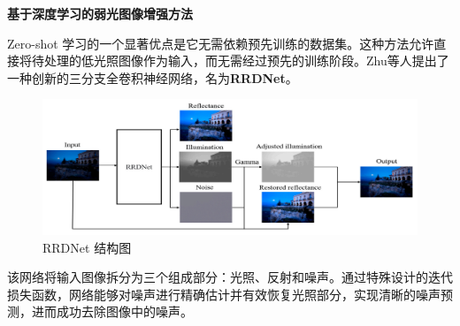 \documentclass[CJK,aspectratio=169]{beamer}  %
\begin{document}
	\begin{frame}
		{ \yahei \textbf{基于深度学习的弱光图像增强方法}}
		
		{ \yahei Zero-shot 学习的一个显著优点是它无需依赖预先训练的数据集。这种方法允许直接将待处理的低光照图像作为输入，而无需经过预先的训练阶段。Zhu等人\textcolor{blue}{\citep{zhu2020zero}}提出了一种创新的三分支全卷积神经网络，名为\textbf{RRDNet}。}
		
		\begin{figure}
			\centering
			\setlength{\abovecaptionskip}{-0.05cm}
			\begin{minipage}{.6\columnwidth}
				\centering 
				\includegraphics[width=\columnwidth]{picture/LLIE/RRDNet/RRDNet}
				\caption{
					\tiny RRDNet 结构图
				}
			\end{minipage}
		\end{figure}
		
		{ \yahei 该网络将输入图像拆分为三个组成部分：光照、反射和噪声。通过特殊设计的迭代损失函数，网络能够对噪声进行精确估计并有效恢复光照部分，实现清晰的噪声预测，进而成功去除图像中的噪声。}
		
	\end{frame}
	
\end{document}
